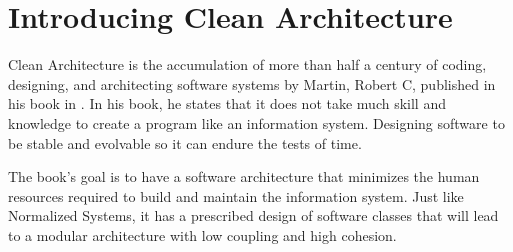 \section{Introducing Clean Architecture}

Clean Architecture is the accumulation of more than half a century of coding, designing,
and architecting software systems by Martin, Robert C, published in his book
 in \citeyear[]{martin_clean_2018}. In his book, he states
that it does not take much skill and knowledge to create a program like an information
system. Designing software to be stable and evolvable so it can endure the tests of time.

The book's goal is to have a software architecture that minimizes the human resources
required to build and maintain the information system. Just like Normalized Systems, it
has a prescribed design of software classes that will lead to a modular architecture with
low coupling and high cohesion. \parencite{martin_clean_2018}
